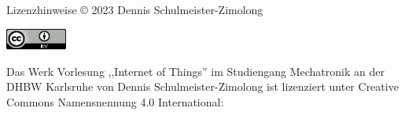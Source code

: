 {
    \tiny
    \begin{frame}{Lizenzhinweise}
            © 2023 Dennis Schulmeister-Zimolong
            \medskip

            \medskip

            \includegraphics[width=2cm]{include/cc-by.png}
            \medskip

            Das Werk Vorlesung ,,Internet of Things'' im Studiengang Mechatronik
            an der DHBW Karlsruhe von Dennis Schulmeister-Zimolong ist lizenziert
            unter Creative Commons Namensnennung 4.0 International:
            \medskip

    \end{frame}
}
